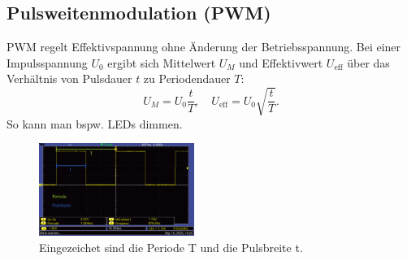 \subsection{Pulsweitenmodulation (PWM)}
PWM regelt Effektivspannung ohne Änderung der Betriebsspannung. Bei einer Impulsspannung $U_0$ ergibt sich Mittelwert $U_M$ und Effektivwert $U_\text{eff}$ über das Verhältnis von Pulsdauer $t$ zu Periodendauer $T$:
\begin{equation}
U_M = U_0 \frac{t}{T}, \quad
U_\text{eff} = U_0 \sqrt{\frac{t}{T}}.
\end{equation}
So kann man bspw. LEDs dimmen.
\begin{figure} [h!]
    \centering
        \includegraphics[width=0.45\textwidth]{img/25/PulsDef.pdf}
    \caption{Eingezeichet sind die Periode T und die Pulsbreite t.}
\end{figure}